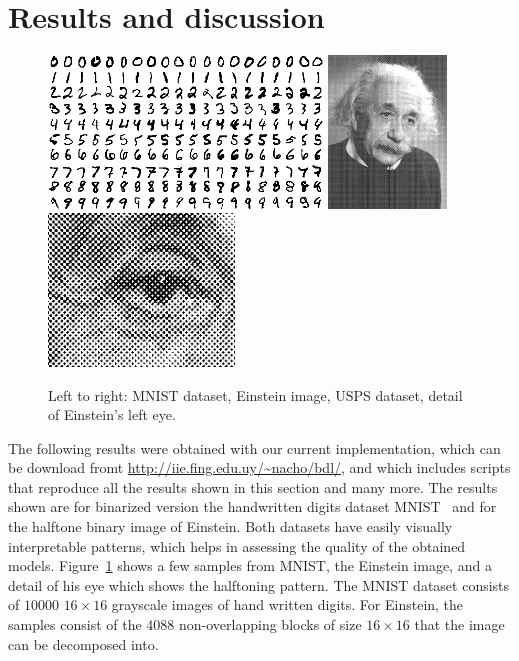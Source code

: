 \documentclass[twocolumn]{IEEEtran}
\theoremstyle{definition}
\begin{document}
\section{Results and discussion}
\label{sec:results}

\begin{figure}[p]
\centering%
\includegraphics[height=1.6in]{fig/mnist_bin.png} %
\includegraphics[height=1.6in]{fig/einstein.png} %
\includegraphics[height=1.6in]{fig/einstein_zoom3.png}
\caption{\label{fig:datasets} Left to right: MNIST dataset, Einstein image, USPS dataset,  detail of Einstein's left eye.}
\end{figure}
%
The following results were obtained with our current implementation, which can be download fromt \url{http://iie.fing.edu.uy/~nacho/bdl/}, and which includes scripts that reproduce all the results shown in this section and many more. The results shown are for binarized version the handwritten digits dataset MNIST~\cite{mnist} and for the halftone binary image of Einstein. Both datasets have easily visually interpretable patterns, which helps in assessing the quality of the obtained models. Figure~\ref{fig:datasets} shows a few samples from MNIST, the Einstein image, and a detail of his eye which shows the halftoning pattern. The MNIST dataset consists of $10000$ $16{\times}16$ grayscale images of hand written digits. For Einstein, the samples consist of the $4088$ non-overlapping blocks of size $16{\times}16$ that the image can be decomposed into.
\end{document}

